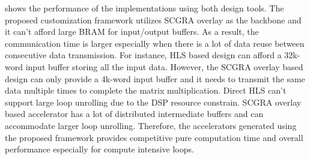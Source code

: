  shows the performance of the implementations using 
both design tools. The proposed customization framework utilizes 
SCGRA overlay as the backbone and it can't afford large 
BRAM for input/output buffers. As a result, the communication time is larger 
especially when there is a lot of data reuse between consecutive data transmission.
For instance, HLS based design can afford a 32k-word input buffer storing all 
the input data. However, the SCGRA overlay based design can only 
provide a 4k-word input buffer and it needs to transmit the same data 
multiple times to complete the matrix multiplication. Direct HLS can't support large 
loop unrolling due to the DSP resource constrain. SCGRA overlay based accelerator 
has a lot of distributed intermediate buffers and can accommodate larger loop unrolling.
Therefore, the accelerators generated using the proposed framework provides competitive 
pure computation time and overall performance especially for compute intensive loops.


